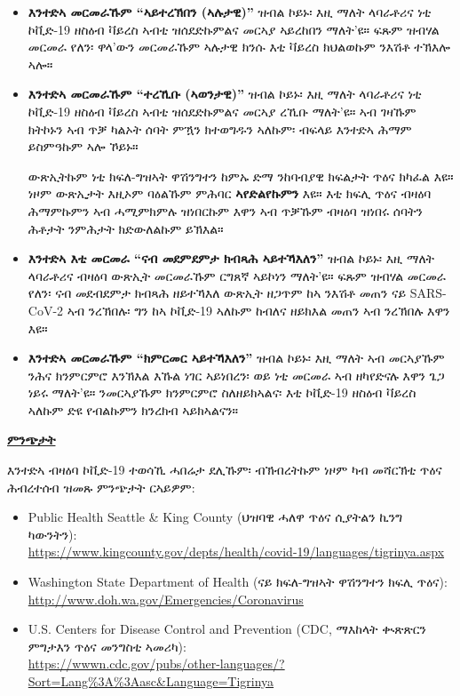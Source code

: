 \documentclass[10pt]{article}
\begin{document}
\begin{itemize}


\item

  \textbf{እንተድኣ መርመራኹም “ኣይተረኽበን (ኣሉታዊ)”} ዝብል ኮይኑ፡ እዚ ማለት ላባራቶሪና
  ነቲ ኮቪድ-19 ዘስዕብ ቫይረስ ኣብቲ ዝሰደድኩምልና መርኣያ ኣይረከበን ማለት’ዩ። ፍጹም ዝብሃል መርመራ የለን፡
  ዋላ’ውን መርመራኹም ኣሉታዊ ክንሱ እቲ ቫይረስ ክህልወኩም ንእሽቶ ተኽእሎ ኣሎ።

\item

  \textbf{እንተድኣ መርመራኹም “ተረኺቡ (ኣወንታዊ)”} ዝብል ኮይኑ፡ እዚ ማለት ላባራቶሪና
  ነቲ ኮቪድ-19 ዘስዕብ ቫይረስ ኣብቲ ዝሰደድኩምልና መርኣያ ረኺቡ ማለት’ዩ። ኣብ ገዛኹም ክትኮኑን ኣብ ጥቓ
  ካልኦት ሰባት ምዃን ክተወግዱን ኣለኩም፡ ብፍላይ እንተድኣ ሕማም ይስምዓኩም ኣሎ ኾይኑ።

  ውጽኢትኩም ነቲ ክፍለ-ግዝኣት ዋሽንግተን ከምኡ ድማ ንከባብያዊ ክፍልታት ጥዕና ክካፈል እዩ። ነዞም ውጽኢታት
  እዚኦም ባዕልኹም ምሕባር  \textbf{ኣየድልየኩምን} እዩ። እቲ ክፍሊ ጥዕና ብዛዕባ ሕማምኩምን ኣብ
  ሓሚምክምሉ ዝነበርኩም እዋን ኣብ ጥቓኹም ብዛዕባ ዝነበሩ ሰባትን ሕቶታት ንምሕታት ክድውለልኩም ይኽእል።

\item

  \textbf{እንተድኣ እቲ መርመራ “ናብ መደምደምታ ክብጻሕ ኣይተኻእለን”} ዝብል ኮይኑ፡ እዚ ማለት
  ላባራቶሪና ብዛዕባ ውጽኢት መርመራኹም ርግጸኛ ኣይኮነን ማለት’ዩ። ፍጹም ዝብሃል መርመራ የለን፡ ናብ መደብደምታ
  ክብጻሕ ዘይተኻእለ ውጽኢት ዘጋጥም ከኣ ንእሽቶ መጠን ናይ SARS-CoV-2 ኣብ ንረኽበሉ፡ ግን ከኣ ኮቪድ-19
  ኣለኩም ከብለና ዘይክእል መጠን ኣብ ንረኽበሉ እዋን እዩ።

\item

  \textbf{እንተድኣ መርመራኹም “ክምርመር ኣይተኻእለን”} ዝብል ኮይኑ፡ እዚ ማለት ኣብ መርኣያኹም
  ንሕና ክንምርምሮ እንኽእል እኹል ነገር ኣይነበረን፡ ወይ ነቲ መርመራ ኣብ ዘካየድናሉ እዋን ጌጋ ነይሩ ማለት’ዩ።
  ንመርኣያኹም ክንምርምሮ ስለዘይክኣልና፡ እቲ ኮቪድ-19 ዘስዕብ ቫይረስ ኣለኩም ድዩ የብልኩምን ክንረክብ ኣይክኣልናን።

\end{itemize}

\bigskip

\large \underline{\textbf{ምንጭታት}}

እንተድኣ ብዛዕባ ኮቪድ-19 ተወሳኺ ሓበሬታ ደሊኹም፡ ብኽብረትኩም ነዞም ካብ መሻርኽቲ ጥዕና ሕብረተሰብ ዝመጹ
ምንጭታት ርኣይዎም:

\begin{itemize}
\item
  Public Health \textemdash Seattle \& King County (ህዝባዊ ሓለዋ ጥዕና ሲያትልን ኪንግ
  ካውንትን):\\
  \url{https://www.kingcounty.gov/depts/health/covid-19/languages/tigrinya.aspx}

\item

  Washington State Department of Health (ናይ ክፍለ-ግዝኣት ዋሽንግተን ክፍሊ ጥዕና):\\
  \url{http://www.doh.wa.gov/Emergencies/Coronavirus}

\item
  U.S. Centers for Disease Control and Prevention (CDC, ማእከላት ቊጽጽርን ምግታእን ጥዕና
  መንግስቲ ኣመሪካ):\\
  \url{https://wwwn.cdc.gov/pubs/other-languages/?Sort=Lang%3A%3Aasc&Language=Tigrinya}

\end{itemize}
\end{document}
